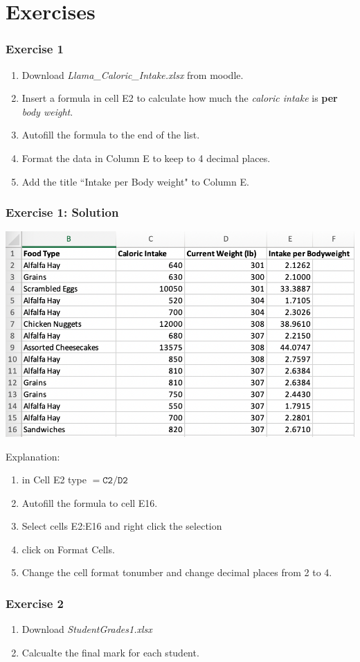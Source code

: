 \documentclass[12pt]{beamer}
\begin{document}
\section{Exercises}
	\begin{frame}
		\frametitle{Exercise 1}
			\begin{enumerate}
				\item Download \textit{Llama\_Caloric\_Intake.xlsx}
				from moodle. 
				\item Insert a formula in cell E2 to calculate how much the \textit{caloric intake} is \textbf{per} \textit{body weight}.
				\item Autofill the formula to the end of the list.
				\item Format the data in Column E to keep to 4 decimal places. 
				\item Add the title ``Intake per Body weight"  to Column E. 
			\end{enumerate}
	\end{frame}
	\begin{frame}
		\frametitle{Exercise 1: Solution}
		\begin{center}
		\includegraphics[width= 0.6 \textwidth]{Exercise1Soln.png}
		\end{center}
	Explanation:\begin{enumerate}
		\item  in Cell E2 type $=\texttt{C2} / \texttt{D2}$
		\item Autofill the formula to cell E16.
		\item Select cells E2:E16 and right click the selection
		\item click on Format Cells.
		\item Change the cell format tonumber and change decimal places from 2 to 4. 
		\end{enumerate}
	\end{frame}
	\begin{frame}
		\frametitle{Exercise 2}
		\begin{enumerate}
			\item Download \textit{StudentGrades1.xlsx}
			\item Calcualte the final mark for each student.
		\end{enumerate}
	\end{frame}
\end{document}
